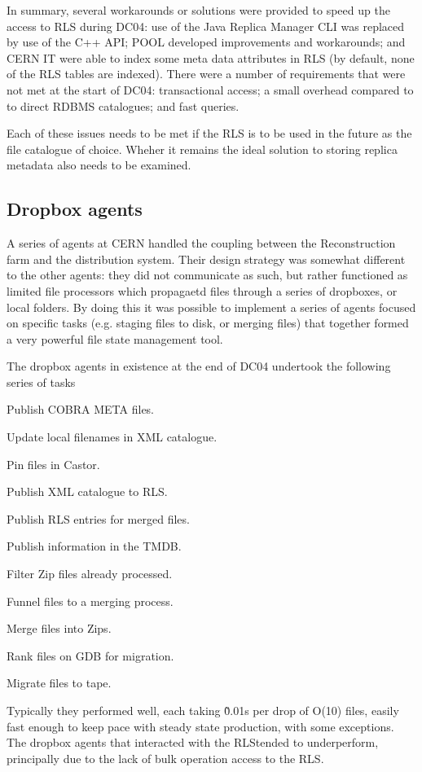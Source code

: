 \documentclass{cmspaper}
\begin{document}
In summary, several workarounds or solutions were provided to speed up
the access to RLS during DC04: use of the Java Replica Manager CLI was
replaced by use of the C++ API; POOL developed improvements and
workarounds; and CERN IT were able to index some meta data attributes
in RLS (by default, none of the RLS tables are indexed). There were a
number of requirements that were not met at the start of DC04:
transactional access; a small overhead compared to to direct RDBMS
catalogues; and fast queries.

Each of these issues needs to be met if the RLS is to be used in the
future as the file catalogue of choice. Wheher it remains the ideal
solution to storing replica metadata also needs to be examined.

\subsection{Dropbox agents}
A series of agents at CERN handled the coupling between the
Reconstruction farm and the distribution system. Their design strategy
was somewhat different to the other agents: they did not communicate
as such, but rather functioned as limited file processors which
propagaetd files through a series of dropboxes, or local folders. By
doing this it was possible to implement a series of agents focused on
specific tasks (e.g. staging files to disk, or merging files) that
together formed a very powerful file state management tool.

The dropbox agents in existence at the end of DC04 undertook the
following series of tasks
\begin{list}{}{}
\item Publish COBRA META files.
\item Update local filenames in XML catalogue.
\item Pin files in Castor.
\item Publish XML catalogue to RLS.
\item Publish RLS entries for merged files.
\item Publish information in the TMDB.
\item Filter Zip files already processed.
\item Funnel files to a merging process.
\item Merge files into Zips.
\item Rank files on GDB for migration.
\item Migrate files to tape.
\end{list}
Typically they performed well, each taking \~0.01s per drop of O(10)
files, easily fast enough to keep pace with steady state production,
with some exceptions. The dropbox agents that interacted with the
RLStended to underperform, principally due to the lack of bulk
operation access to the RLS.
\end{document}
